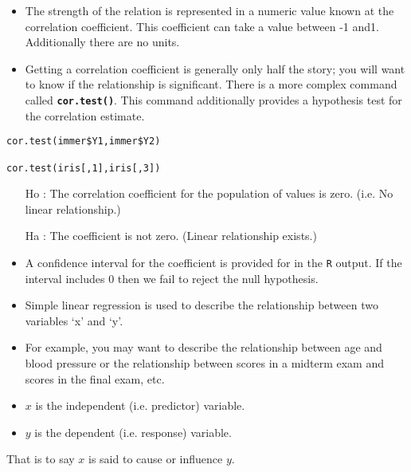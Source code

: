 \begin{itemize}

\item The strength of the relation is represented in a numeric value known at the correlation coefficient. This coefficient can take a value between -1 and1. Additionally there are no units.

\item Getting a correlation coefficient is generally only half the story; you will want to know if the relationship is significant. There is a more complex command called \texttt{\textbf{cor.test()}}. This command additionally provides a hypothesis test for the correlation estimate.
\end{itemize}
\begin{framed}
\begin{verbatim}
cor.test(immer$Y1,immer$Y2)

cor.test(iris[,1],iris[,3])
\end{verbatim}
\end{framed}

\begin{framed}
\begin{itemize}
\item[Ho] : The correlation coefficient for the population of values is zero. (i.e. No linear relationship.)
\item[Ha]: The coefficient is not zero. (Linear relationship exists.)
\end{itemize}	
\end{framed}

\begin{itemize}
\item A confidence interval for the coefficient is provided for in the \texttt{R} output. If the interval includes 0 then we fail to reject the null hypothesis.

\item Simple linear regression is used to describe the relationship between two variables ‘x’ and ‘y’.

\item 
For example, you may want to describe the relationship between age and blood pressure or the relationship between scores in a midterm exam and scores in the final exam, etc.
\end{itemize}

\begin{itemize}
\item	$x$ is the independent (i.e. predictor) variable.
\item	$y$ is the dependent (i.e. response) variable.
\end{itemize}
That is to say $x$ is said to cause or influence $y$.

